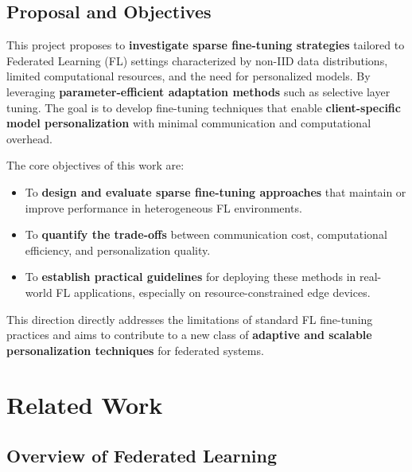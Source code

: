 \documentclass[10pt,twocolumn,letterpaper]{article}
\begin{document}
\subsection{Proposal and Objectives}

This project proposes to \textbf{investigate sparse fine-tuning strategies} tailored to Federated Learning (FL) settings characterized by non-IID data distributions, limited computational resources, and the need for personalized models. By leveraging \textbf{parameter-efficient adaptation methods} such as selective layer tuning. The goal is to develop fine-tuning techniques that enable \textbf{client-specific model personalization} with minimal communication and computational overhead.

The core objectives of this work are:

\begin{itemize}
    \item To \textbf{design and evaluate sparse fine-tuning approaches} that maintain or improve performance in heterogeneous FL environments.
    \item To \textbf{quantify the trade-offs} between communication cost, computational efficiency, and personalization quality.
    \item To \textbf{establish practical guidelines} for deploying these methods in real-world FL applications, especially on resource-constrained edge devices.
\end{itemize}

This direction directly addresses the limitations of standard FL fine-tuning practices and aims to contribute to a new class of \textbf{adaptive and scalable personalization techniques} for federated systems.


\section{Related Work}
\label{sec:relatedwork}

\subsection{Overview of Federated Learning}
\end{document}
